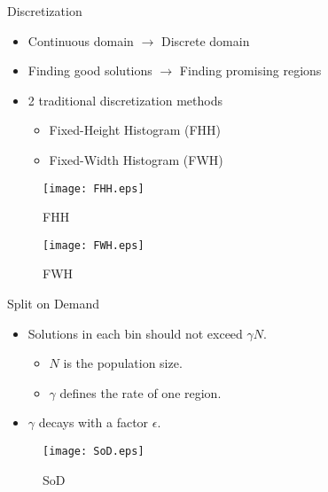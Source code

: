 \begin{frame}{Discretization} 
  \begin{itemize} 
    \item Continuous domain $\rightarrow$ Discrete domain 
    \item Finding good solutions $\rightarrow$ Finding promising
      regions
    \item 2 traditional discretization methods
      \begin{itemize}
        \item Fixed-Height Histogram (FHH)
        \item Fixed-Width Histogram (FWH)
      \end{itemize}
      \vspace*{2pt}
  \end{itemize}
  \begin{minipage}{.45\textwidth}
    \begin{figure}
      \centering
      \texttt{[image: FHH.eps]}
      \caption{FHH}
    \end{figure}
  \end{minipage}
  \begin{minipage}{.45\textwidth}
    \begin{figure}
      \centering
      \texttt{[image: FWH.eps]}
      \caption{FWH}
    \end{figure}
  \end{minipage}

\end{frame}

\begin{frame}{Split on Demand}
  \begin{itemize}
    \item Solutions in each bin should not exceed $\gamma N$.
      \begin{itemize}
        \item $N$ is the population size.
        \item $\gamma$ defines the rate of one region.
      \end{itemize}
    \item $\gamma$ decays with a factor $\epsilon$.
  \end{itemize}
  \begin{figure}[h]
    \texttt{[image: SoD.eps]}
    \caption{SoD}
  \end{figure}
\end{frame}

